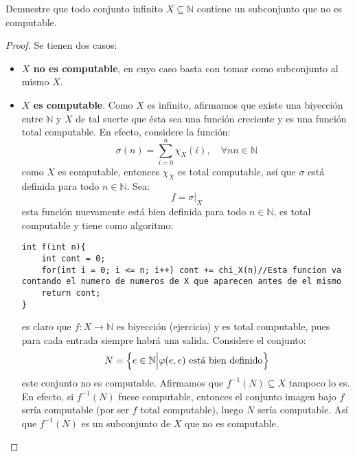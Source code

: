 \documentclass[12pt]{report}
\newcounter{it}
\theoremstyle{largebreak}
\newcommand\cf[3]{\ensuremath{#1:#2\rightarrow#3}}
\begin{document}
    \begin{excer}
        Demuestre que todo conjunto infinito $X\subseteq\mathbb{N}$ contiene un subconjunto que no es computable.
    \end{excer}
    
    \begin{proof}
        Se tienen dos casos:
        \begin{itemize}
            \item \textbf{$X$ no es computable}, en cuyo caso basta con tomar como subconjunto al mismo $X$.
            \item \textbf{$X$ es computable}. Como $X$ es infinito, afirmamos que existe una biyección entre $\mathbb{N}$ y $X$ de tal suerte que ésta sea una función creciente y es una función total computable. En efecto, considere la función:
            \begin{equation*}
                \sigma(n)=\sum_{ i=0}^n \chi_X(i),\quad\forall nn\in\mathbb{N}
            \end{equation*}
            como $X$ es computable, entonces $\chi_X$ es total computable, así que $\sigma$ está definida para todo $n\in\mathbb{N}$. Sea:
            \begin{equation*}
                f=\sigma\big|_{X}
            \end{equation*}
            esta función nuevamente está bien definida para todo $n\in\mathbb{N}$, es total computable y tiene como algoritmo:
            \begin{lstlisting}
int f(int n){
    int cont = 0;
    for(int i = 0; i <= n; i++) cont += chi_X(n)//Esta funcion va contando el numero de numeros de X que aparecen antes de el mismo
    return cont;
}
            \end{lstlisting}
            es claro que $\cf{f}{X}{\mathbb{N}}$ es biyección (ejercicio) y es total computable, pues para cada entrada siempre habrá una salida. Considere el conjunto:
            \begin{eqnarray}
                N=\left\{e\in\mathbb{N}\Big|\varphi(e,e)\textup{ está bien definido} \right\}
            \end{eqnarray}
            este conjunto no es computable. Afirmamos que $f^{-1}(N)\subseteq X$ tampoco lo es. En efecto, si $f^{-1}(N)$ fuese computable, entonces el conjunto imagen bajo $f$ sería computable (por ser $f$ total computable), luego $N$ sería computable. Así que $f^{-1}(N)$ es un subconjunto de $X$ que no es computable.
        \end{itemize}
    \end{proof}
\end{document}
